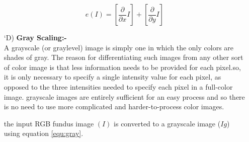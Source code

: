 \begin{itemize}[labelindent=1em,labelsep=0.25cm,leftmargin=*]
        \begin{equation}
            e(I) = [\frac{\partial}{\partial x} I] + [\frac{\partial}{\partial y} I]
            \label{equ:blur}
        \end{equation}
        \item[\char `D)] \textbf{Gray Scaling:-}\\
        A grayscale (or graylevel) image is simply one in which the only colors are shades of gray. The reason for differentiating such images from any other sort of color image is that less information needs to be provided for each pixel.so, it is only necessary to specify a single intensity value for each pixel, as opposed to the three intensities needed to specify each pixel in a full-color image.
        grayscale images are entirely sufficient for an easy process and so there is no need to use more complicated and harder-to-process color images.
        
        the input RGB fundus image $(I)$ is converted to a grayscale image ($Ig$) using equation \ref{equ:gray}.
        

\end{itemize}
